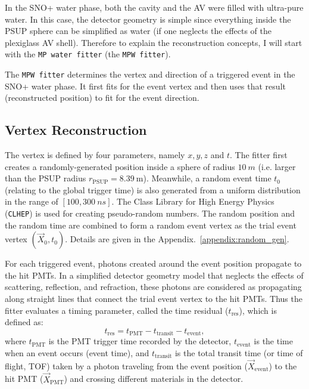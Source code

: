 In the SNO+ water phase, both the cavity and the AV were filled with ultra-pure water. In this case, the detector geometry is simple since everything inside the PSUP sphere can be simplified as water (if one neglects the effects of the plexiglass AV shell). Therefore to explain the reconstruction concepts, I will start with the \texttt{MP water fitter} (the \texttt{MPW fitter}).

The \texttt{MPW fitter} determines the vertex and direction of a triggered event in the SNO+ water phase. It first fits for the event vertex and then uses that result (reconstructed position) to fit for the event direction.

\subsection{Vertex Reconstruction}\label{sect:waterVertex}

The vertex is defined by four parameters, namely $x,y,z$ and $t$. The fitter first creates a randomly-generated position inside a sphere of radius $10~m$ (i.e. larger than the PSUP radius $r_{\mathrm{PSUP}}=8.39~$m). Meanwhile, a random event time $t_0$ (relating to the global trigger time) is also generated from a uniform distribution in the range of $[100,300~ns]$. The Class Library for High Energy Physics (\texttt{CLHEP}) is used for creating pseudo-random numbers. The random position and the random time are combined to form a random event vertex as the trial event vertex $(\vec{X}_0,t_0)$. Details are given in the Appendix.~\ref{appendix:random_gen}.

For each triggered event, photons created around the event position propagate to the hit PMTs. In a simplified detector geometry model that neglects the effects of scattering, reflection, and refraction, these photons are considered as propagating along straight lines that connect the trial event vertex to the hit PMTs. Thus the fitter evaluates a timing parameter, called the time residual ($t_\mathrm{res}$), which is defined as:
\begin{equation}
\label{eq:tres_define}
t_\mathrm{res}=t_\mathrm{PMT} - t_{\mathrm{transit}} - t_{\mathrm{event}},
\end{equation}
where $t_\mathrm{PMT}$ is the PMT trigger time recorded by the detector, $t_{\mathrm{event}}$ is the time when an event occurs (event time), and $t_{\mathrm{transit}}$ is the total transit time (or time of flight, TOF) taken by a photon traveling from the event position ($\vec{X}_{\mathrm{event}}$) to the hit PMT ($\vec{X}_{\mathrm{PMT}}$) and crossing different materials in the detector.

